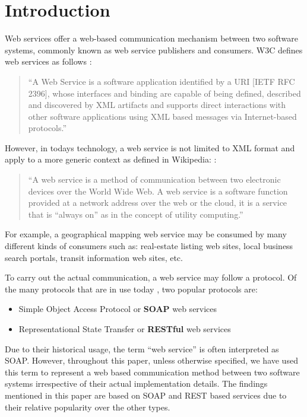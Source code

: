 \documentclass[runningheads,a4paper]{llncs}
\begin{document}
\section{Introduction}

Web services offer a web-based communication mechanism between two software systems, commonly known as web service publishers and consumers. W3C defines web services as follows \cite{w3c_web_service}:

\begin{quote}
``A Web Service is a software application identified by a URI [IETF RFC 2396], whose interfaces and binding are capable of being defined, described and discovered by XML artifacts and supports direct interactions with other software applications using XML based messages via Internet-based protocols.''
\end{quote}

However, in todays technology, a web service is not limited to XML format and apply to a more generic context as defined in Wikipedia: \cite{web_service_wiki}:

\begin{quote}
``A web service is a method of communication between two electronic devices over the World Wide Web. A web service is a software function provided at a network address over the web or the cloud, it is a service that is ``always on'' as in the concept of utility computing.''
\end{quote}

For example, a geographical mapping web service may be consumed by many different kinds of consumers such as: real-estate listing web sites, local business search portals, transit information web sites, etc.

To carry out the actual communication, a web service may follow a protocol. Of the many protocols that are in use today \cite{web_service_protocols_wiki}, two popular protocols are:

\begin{itemize}
  \item Simple Object Access Protocol or \textbf{SOAP} web services
  \item Representational State Transfer or \textbf{RESTful} web services
\end{itemize}

Due to their historical usage, the term ``web service'' is often interpreted as SOAP. However, throughout this paper, unless otherwise specified, we have used this term to represent a web based communication method between two software systems irrespective of their actual implementation details. The findings mentioned in this paper are based on SOAP and REST based services due to their relative popularity over the other types.
\end{document}
